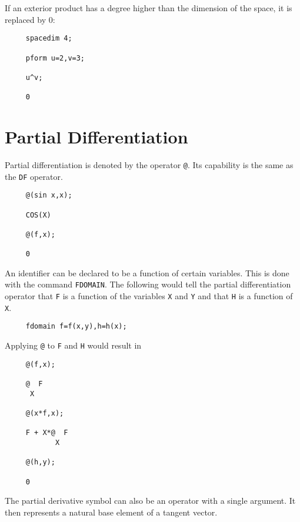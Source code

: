 If an exterior product has a degree higher than the dimension of the
space, it is replaced by 0:

\begin{verbatim}
     spacedim 4;

     pform u=2,v=3;

     u^v;

     0
\end{verbatim}


\section{Partial Differentiation}

Partial differentiation is denoted by the operator {\tt @}\label{at}.  Its
capability is the same as the {\REDUCE} {\tt DF} operator.
 

\example{}

\begin{verbatim}
     @(sin x,x);

     COS(X)

     @(f,x);

     0
\end{verbatim}

An identifier can be declared to be a function of certain variables.
This is done with the command {\tt FDOMAIN}\label{FDOMAIN}.  The
following would tell the partial differentiation operator that {\tt F}
is a function of the variables {\tt X} and {\tt Y} and that {\tt H} is
a function of {\tt X}.

\begin{verbatim}
     fdomain f=f(x,y),h=h(x);
\end{verbatim}

Applying {\tt @} to {\tt F} and {\tt H} would result in

\begin{verbatim}
     @(f,x);

     @  F
      X

     @(x*f,x);

     F + X*@  F
            X

     @(h,y);

     0
\end{verbatim}

The partial derivative symbol can also be an operator with a single
argument.  It then represents a natural base element of a tangent
vector\label{at1}.


